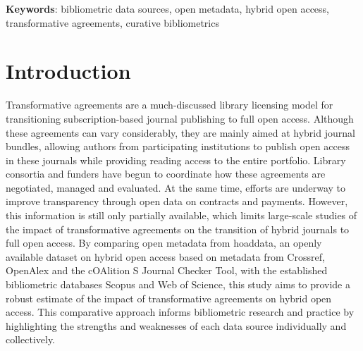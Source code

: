 \documentclass[a4paper,man,floatsintext,longtable,noextraspace,10pt]{apa6}
\begin{document}
{\textbf{Keywords}: bibliometric data sources, open metadata, hybrid open access, transformative agreements, curative bibliometrics}

\newpage

\setcounter{secnumdepth}{2}

\section{Introduction}\label{introduction}

Transformative agreements are a much-discussed library licensing model
for transitioning subscription-based journal publishing to full open
access. Although these agreements can vary considerably, they are mainly
aimed at hybrid journal bundles, allowing authors from participating
institutions to publish open access in these journals while providing
reading access to the entire portfolio. Library consortia and funders
have begun to coordinate how these agreements are negotiated, managed
and evaluated. At the same time, efforts are underway to improve
transparency through open data on contracts and payments. However, this
information is still only partially available, which limits large-scale
studies of the impact of transformative agreements on the transition of
hybrid journals to full open access. By comparing open metadata from
hoaddata, an openly available dataset on hybrid open access based on
metadata from Crossref, OpenAlex and the cOAlition S Journal Checker
Tool, with the established bibliometric databases Scopus and Web of
Science, this study aims to provide a robust estimate of the impact of
transformative agreements on hybrid open access. This comparative
approach informs bibliometric research and practice by highlighting the
strengths and weaknesses of each data source individually and
collectively.
\end{document}
